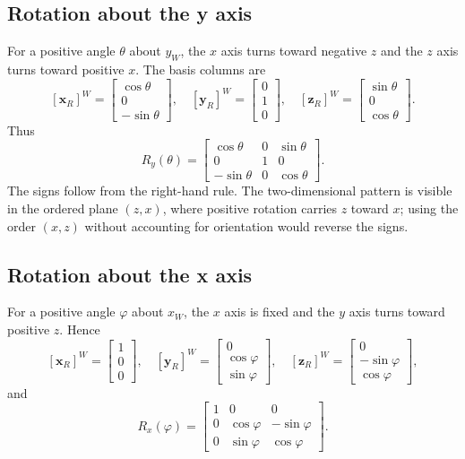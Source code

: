 \subsection{Rotation about the y axis}
For a positive angle $\theta$ about $y_W$, the $x$ axis turns toward negative
$z$ and the $z$ axis turns toward positive $x$. The basis columns are
\[
 [\boldsymbol{x}_R]^W=\begin{bmatrix}\cos\theta\\0\\-\sin\theta\end{bmatrix},\quad
 [\boldsymbol{y}_R]^W=\begin{bmatrix}0\\1\\0\end{bmatrix},\quad
 [\boldsymbol{z}_R]^W=\begin{bmatrix}\sin\theta\\0\\\cos\theta\end{bmatrix}.
\]
Thus
\begin{equation}
 \boxed{R_y(\theta)=\begin{bmatrix}
 \cos\theta&0&\sin\theta\\0&1&0\\-\sin\theta&0&\cos\theta
 \end{bmatrix}.}
 \label{eq:l04-ry}
\end{equation}
The signs follow from the right-hand rule. The two-dimensional pattern is
visible in the ordered plane $(z,x)$, where positive rotation carries $z$
toward $x$; using the order $(x,z)$ without accounting for orientation would
reverse the signs.

\subsection{Rotation about the x axis}
For a positive angle $\varphi$ about $x_W$, the $x$ axis is fixed and the
$y$ axis turns toward positive $z$. Hence
\[
 [\boldsymbol{x}_R]^W=\begin{bmatrix}1\\0\\0\end{bmatrix},\quad
 [\boldsymbol{y}_R]^W=\begin{bmatrix}0\\\cos\varphi\\\sin\varphi\end{bmatrix},\quad
 [\boldsymbol{z}_R]^W=\begin{bmatrix}0\\-\sin\varphi\\\cos\varphi\end{bmatrix},
\]
and
\begin{equation}
 \boxed{R_x(\varphi)=\begin{bmatrix}
 1&0&0\\0&\cos\varphi&-\sin\varphi\\0&\sin\varphi&\cos\varphi
 \end{bmatrix}.}
 \label{eq:l04-rx}
\end{equation}

